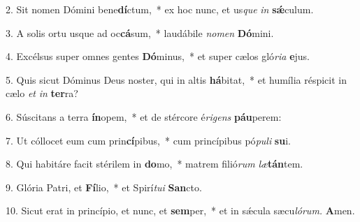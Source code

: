 \item 2. Sit nomen Dómini bene\textbf{dí}ctum,~* ex hoc nunc, et us\hspace{0.02em}\textit{que} \textit{in} \textbf{sǽ}culum.
\item 3. A solis ortu usque ad oc\textbf{cá}sum,~* laudábile \textit{nomen} \textbf{Dó}mini.
\item 4. Excélsus super omnes gentes \textbf{Dó}minus,~* et super cælos gló\textit{ria} \textbf{e}jus.
\item 5. Quis sicut Dóminus Deus noster, qui in altis \textbf{há}bitat,~* et humília réspicit in cælo \textit{et} \textit{in} \textbf{ter}ra?
\item 6. Súscitans a terra \textbf{ín}opem,~* et de stércore é\textit{rigens} \textbf{páu}perem:
\item 7. Ut cóllocet eum cum prin\textbf{cí}pibus,~* cum princípibus pó\textit{puli} \textbf{su}i.
\item 8. Qui habitáre facit stérilem in \textbf{do}mo,~* matrem filió\textit{rum} \textit{læ}\textbf{tán}tem.
\item 9. Glória Patri, et \textbf{Fí}lio,~* et Spirí\hspace{0.03em}\textit{tui} \textbf{San}cto.
\item 10. Sicut erat in princípio, et nunc, et \textbf{sem}per,~* et in sǽcula sæcu\hspace{0.03em}\textit{lórum.} \textbf{A}men.

